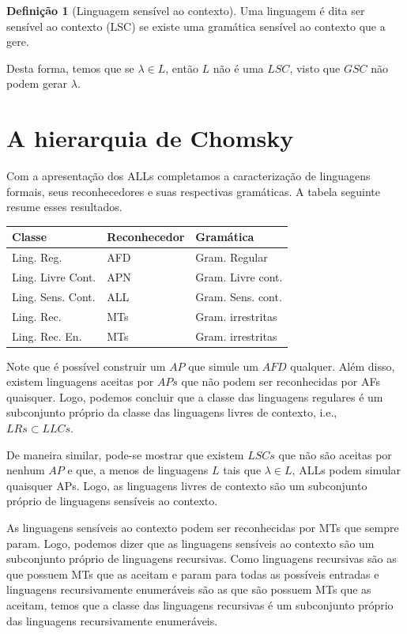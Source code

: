 \documentclass[a4paper]{article}
\theoremstyle{definition}
\newtheorem{Definition}{Definição}
\begin{document}
     \begin{Definition}[Linguagem sensível ao contexto]
       Uma linguagem é dita ser sensível ao contexto (LSC) se existe uma
       gramática sensível ao contexto que a gere.
     \end{Definition}

     Desta forma, temos que se $\lambda \in L$, então $L$ não é uma $LSC$, visto
     que $GSC$ não podem gerar $\lambda$.

     \section{A hierarquia de Chomsky}

     Com a apresentação dos ALLs completamos a caracterização de linguagens
     formais, seus reconhecedores e suas respectivas gramáticas. A tabela
     seguinte resume esses resultados.
     
     \begin{table}[H]
       \begin{tabular}{|l|l|l|}
         \hline
         Classe & Reconhecedor & Gramática \\ 
         \hline 
         Ling. Reg. & AFD & Gram. Regular \\ 
         Ling. Livre Cont. & APN & Gram. Livre cont. \\
         Ling. Sens. Cont. & ALL & Gram. Sens. cont.\\
         Ling. Rec. & MTs & Gram. irrestritas \\
         Ling. Rec. En. & MTs & Gram. irrestritas\\ \hline
       \end{tabular}
       \centering
     \end{table}

     Note que é possível construir um $AP$ que simule um $AFD$ qualquer. Além
     disso, existem linguagens aceitas por $APs$ que não podem ser reconhecidas 
     por AFs quaisquer. Logo, podemos concluir que a classe das linguagens
     regulares é um subconjunto próprio da classe das linguagens livres de
     contexto, i.e., $LRs \subset LLCs$.

     De maneira similar, pode-se mostrar que existem $LSCs$ que não são aceitas
     por nenhum $AP$ e que, a menos de linguagens $L$ tais que $\lambda \in L$,
     ALLs podem simular quaisquer APs. Logo, as linguagens livres de contexto
     são um subconjunto próprio de linguagens sensíveis ao contexto.

     As linguagens sensíveis ao contexto podem ser reconhecidas por MTs que
     sempre param. Logo, podemos dizer que as linguagens sensíveis ao contexto
     são um subconjunto próprio de linguagens recursivas. Como linguagens
     recursivas são as que possuem MTs que as aceitam e param para todas as
     possíveis entradas e linguagens recursivamente enumeráveis são as que são
     possuem MTs que as aceitam, temos que a classe das linguagens recursivas é
     um subconjunto próprio das linguagens recursivamente enumeráveis.
\end{document}
